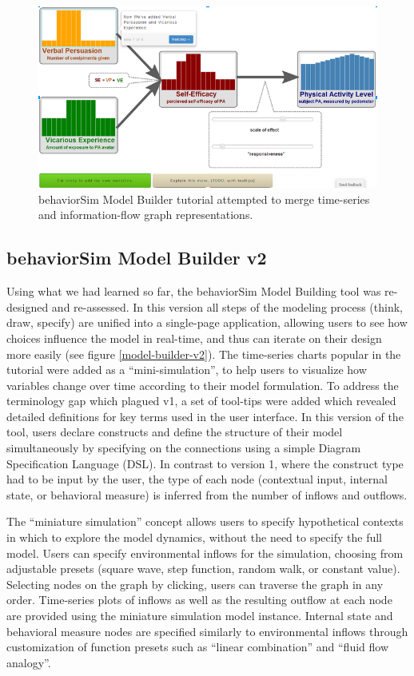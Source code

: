 \documentclass{sigchi}
\begin{document}
\begin{figure}[!t]
  \centering
  \includegraphics[width=0.9\columnwidth]{img/v1-flow}  
  \caption{behaviorSim Model Builder tutorial attempted to merge time-series and information-flow graph representations.}
  \label{model-builder-tutorial}
\end{figure}

\subsection{behaviorSim Model Builder v2}
Using what we had learned so far, the behaviorSim Model Building tool was re-designed and re-assessed.
In this version all steps of the modeling process (think, draw, specify) are unified into a single-page application, allowing users to see how choices influence the model in real-time, and thus can iterate on their design more easily (see figure \ref{model-builder-v2}).
The time-series charts popular in the tutorial were added as a ``mini-simulation'', to help users to visualize how variables change over time according to their model formulation.
To address the terminology gap which plagued v1, a set of tool-tips were added which revealed detailed definitions for key terms used in the user interface.
In this version of the tool, users declare constructs and define the structure of their model simultaneously by specifying on the connections using a simple Diagram Specification Language (DSL). 
In contrast to version 1, where the construct type had to be input by the user, the type of each node (contextual input, internal state, or behavioral measure) is inferred from the number of inflows and outflows.

The ``miniature simulation'' concept allows users to specify hypothetical contexts in which to explore the model dynamics, without the need to specify the full model.
Users can specify environmental inflows for the simulation, choosing from adjustable presets (square wave, step function, random walk, or constant value).
Selecting nodes on the graph by clicking, users can traverse the graph in any order.
Time-series plots of inflows as well as the resulting outflow at each node are provided using the miniature simulation model instance.
Internal state and behavioral measure nodes are specified similarly to environmental inflows through customization of function presets such as ``linear combination'' and ``fluid flow analogy''\cite{martin2014dynamical}.
\end{document}
